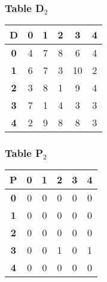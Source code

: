 \begin{frame}
\frametitle{Table D$_{2}$}
\begin{center}
    \begin{tabular}{|c||c|c|c|c|c|}
        \hline
        \textbf{D} & \textbf{0} & \textbf{1} & \textbf{2} & \textbf{3} & \textbf{4} \\
        \hline
        \hline
        \textbf{0}& 4 & 7 & 8 & 6 & 4 \\
        \hline
        \textbf{1}& 6 & 7 & 3 & 10 & 2 \\
        \hline
        \textbf{2}& 3 & 8 & 1 & 9 & 4 \\
        \hline
        \textbf{3}& 7 & 1 & \cellcolor{yellow}4 & 3 & \cellcolor{yellow}3 \\
        \hline
        \textbf{4}& 2 & 9 & 8 & 8 & 3 \\
        \hline
    \end{tabular}
\end{center}


\end{frame}


\begin{frame}
\frametitle{Table P$_{2}$}
\begin{center}
    \begin{tabular}{|c||c|c|c|c|c|}
        \hline
        \textbf{P} & \textbf{0} & \textbf{1} & \textbf{2} & \textbf{3} & \textbf{4} \\
        \hline
        \hline
        \textbf{0}& 0 & 0 & 0 & 0 & 0 \\
        \hline
        \textbf{1}& 0 & 0 & 0 & 0 & 0 \\
        \hline
        \textbf{2}& 0 & 0 & 0 & 0 & 0 \\
        \hline
        \textbf{3}& 0 & 0 & \cellcolor{yellow}1 & 0 & \cellcolor{yellow}1 \\
        \hline
        \textbf{4}& 0 & 0 & 0 & 0 & 0 \\
        \hline
    \end{tabular}
\end{center}


\end{frame}


